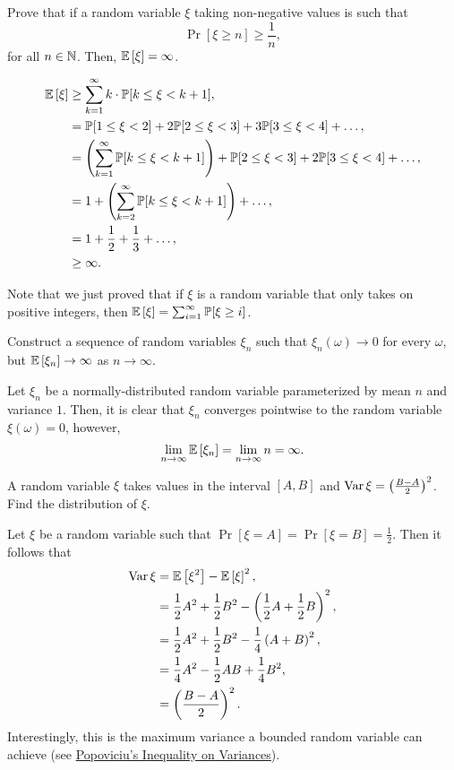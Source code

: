 \begin{problem}{2}
    Prove that if a random variable $\xi$ taking non-negative values is such that \[
        \Pr[\xi \geq n] \geq \frac{1}{n},
    \]
    for all $n\in\mathbb{N}$. Then, $\mathbb{E}\left[\xi\right] = \infty$.
\end{problem}
\begin{solution}
    \begin{align*}
        \mathbb{E}\left[\xi\right] &\geq \sum_{k=1}^\infty k\cdot \mathbb{P}[k \leq \xi < k + 1], \\
        &= \mathbb{P}[1 \leq \xi < 2] + 2\mathbb{P}[2 \leq \xi < 3] + 3\mathbb{P}[3 \leq \xi < 4] + \ldots, \\
        &= \left(\sum_{k=1}^\infty \mathbb{P}[k \leq \xi < k+1]\right) + \mathbb{P}[2\leq \xi < 3] + 2\mathbb{P}[3 \leq \xi < 4] + \ldots, \\
        &= 1 + \left(\sum_{k=2}^\infty \mathbb{P}[k \leq \xi < k+1]\right) + \ldots, \\
        &= 1 + \frac{1}{2} + \frac{1}{3} + \ldots, \\
        &\geq \infty.
    \end{align*}
\end{solution}
Note that we just proved that if $\xi$ is a random variable that only takes on positive integers, then $\mathbb{E}\left[\xi\right] = \sum_{i=1}^\infty \mathbb{P}[\xi \geq i]$.

\begin{problem}{3}
    Construct a sequence of random variables $\xi_n$ such that $\xi_n(\omega) \to 0$ for every $\omega$, but $\mathbb{E}\left[\xi_n\right]\to\infty$ as $n\to\infty$.
\end{problem}
\begin{solution}
    Let $\xi_n$ be a normally-distributed random variable parameterized by mean $n$ and variance $1$. Then, it is clear that $\xi_n$ converges pointwise to the random variable $\xi(\omega) = 0$, however, 
    \[
        \lim_{n\to\infty} \mathbb{E}\left[\xi_n\right] = \lim_{n\to\infty} n = \infty.
    \]
\end{solution}

\begin{problem}{4}
A random variable $\xi$ takes values in the interval $[A,B]$ and $\operatorname{Var}{\xi} = \left(\frac{B-A}{2}\right)^2$. Find the distribution of $\xi$.
\end{problem}
\begin{solution}
    Let $\xi$ be a random variable such that $\Pr[\xi = A] = \Pr[\xi=B] = \frac{1}{2}$. Then it follows that 
    \begin{align*}
        \operatorname{Var}{\xi} &= \mathbb{E}\left[\xi^2\right] - \mathbb{E}\left[\xi\right]^2, \\
        &= \frac{1}{2}A^2 + \frac{1}{2}B^2 - \left(\frac{1}{2}A + \frac{1}{2}B\right)^2, \\
        &= \frac{1}{2}A^2 + \frac{1}{2}B^2 - \frac{1}{4}\left(A + B\right)^2, \\
        &= \frac{1}{4}A^2 - \frac{1}{2}AB + \frac{1}{4}B^2, \\
        &= \left(\frac{B-A}{2}\right)^2.
    \end{align*}
    Interestingly, this is the maximum variance a bounded random variable can achieve (see \href{https://en.wikipedia.org/wiki/Popoviciu%27s_inequality_on_variances}{Popoviciu's Inequality on Variances}).
\end{solution}

